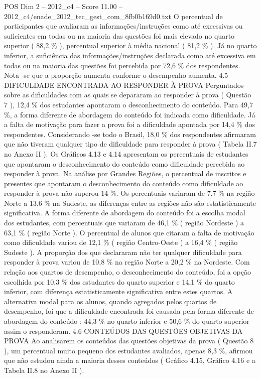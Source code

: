 \begin{textsample}{POS Dim 2 – 2012\_c4 – Score 11.00 – 2012\_c4/enade\_2012\_tec\_gest\_com\_8fb0b169d0.txt}
O percentual de participantes que avaliaram as informações/instruções como até excessivas ou suficientes em todas ou na maioria das questões foi mais elevado no quarto superior ( 88,2 \% ), percentual superior à média nacional ( 81,2 \% ).
Já no quarto inferior, a suficiência das informações/instruções declarada como até excessiva em todas ou na maioria das questões foi percebida por 72,6 \% dos respondentes.
Nota -se que a proporção aumenta conforme o desempenho aumenta. 4.5 DIFICULDADE ENCONTRADA AO RESPONDER À PROVA Perguntados sobre as dificuldades com as quais se depararam ao responder à prova ( Questão 7 ), 12,4 \% dos estudantes apontaram o desconhecimento do conteúdo.
Para 49,7 \%, a forma diferente de abordagem do conteúdo foi indicada como dificuldade.
Já a falta de motivação para fazer a prova foi a dificuldade apontada por 14,4 \% dos respondentes.
Considerando -se todo o Brasil, 18,0 \% dos respondentes afirmaram que não tiveram qualquer tipo de dificuldade para responder à prova ( Tabela II.7 no Anexo II ).
Os Gráficos 4.13 e 4.14 apresentam os percentuais de estudantes que apontaram o desconhecimento do conteúdo como dificuldade percebida ao responder à prova.
Na análise por Grandes Regiões, o percentual de inscritos e presentes que apontaram o desconhecimento do conteúdo como dificuldade ao responder à prova não superou 14 \%.
Os percentuais variaram de 7,7 \% na região Norte a 13,6 \% na Sudeste, as diferenças entre as regiões não são estatisticamente significativa.
A forma diferente de abordagem do conteúdo foi a escolha modal dos estudantes, com percentuais que variaram de 46,1 \% ( região Nordeste ) a 63,1 \% ( região Norte ).
O percentual de alunos que citaram a falta de motivação como dificuldade variou de 12,1 \% ( região Centro-Oeste ) a 16,4 \% ( região Sudeste ).
A proporção dos que declararam não ter qualquer dificuldade para responder à prova variou de 10,8 \% na região Norte a 20,2 \% na Nordeste.
Com relação aos quartos de desempenho, o desconhecimento do conteúdo, foi a opção escolhida por 10,3 \% dos estudantes do quarto superior e 14,1 \% do quarto inferior, com diferença estatisticamente significativa entre estes quartos.
A alternativa modal para os alunos, quando agregados pelos quartos de desempenho, foi que a dificuldade encontrada foi causada pela forma diferente de abordagem do conteúdo : 44,3 \% no quarto inferior e 50,6 \% do quarto superior assim o responderam. 4.6 CONTEÚDOS DAS QUESTÕES OBJETIVAS DA PROVA Ao analisarem os conteúdos das questões objetivas da prova ( Questão 8 ), um percentual muito pequeno dos estudantes avaliados, apenas 8,3 \%, afirmou que não estudou ainda a maioria desses conteúdos ( Gráfico 4.15, Gráfico 4.16 e a Tabela II.8 no Anexo II ).

\end{textsample}
